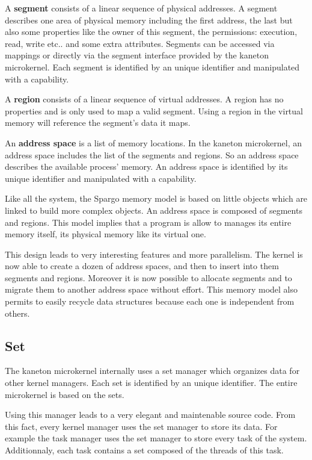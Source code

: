 \documentclass[10pt,a4wide]{article}
\begin{document}
\begin{multicols}{2}
A \textbf{segment} consists of a linear sequence of physical addresses.
A segment describes one area of physical memory including the
first address, the last but also some properties like the owner of this
segment, the permissions: execution, read, write etc.. and some
extra attributes. Segments can be accessed via mappings or directly via
the segment interface provided by the kaneton microkernel. Each segment
is identified by an unique identifier and manipulated with a capability.

A \textbf{region} consists of a linear sequence of virtual addresses.
A region has no properties and is only used to map a valid segment.
Using a region in the virtual memory will reference the segment's data
it maps.

An \textbf{address space} is a list of memory locations. In the kaneton
microkernel, an address space includes the list of the segments and regions.
So an address space describes the available process' memory. An address space
is identified by its unique identifier and manipulated with a capability.

Like all the system, the Spargo memory model is based on little objects which
are linked to build more complex objects. An address space is composed
of segments and regions. This model implies that a program is allow to
manages its entire memory itself, its physical memory like its virtual one.

This design leads to very interesting features and more parallelism.
The kernel is now able to create a dozen of address spaces, and then to
insert into them segments and regions. Moreover it is now possible to allocate
segments and to migrate them to another address space without effort. This
memory model also permits to easily recycle data structures because each one
is independent from others.

\subsection{Set}

The kaneton microkernel internally uses a set manager which organizes data
for other kernel managers. Each set is identified by an unique identifier.
The entire microkernel is based on the sets.

Using this manager leads to a very elegant and maintenable source code. From
this fact, every kernel manager uses the set manager to store its data. For
example the task manager uses the set manager to store every task of the
system. Additionnaly, each task contains a set composed of the threads of
this task.


\end{multicols}
\end{document}
